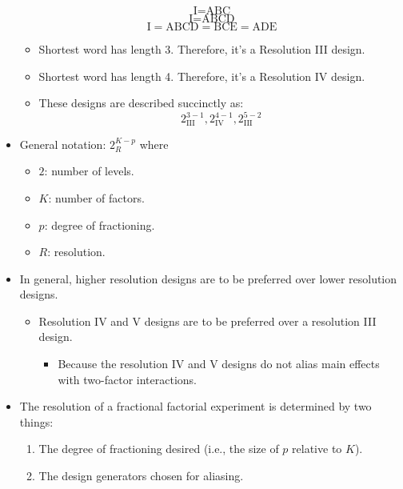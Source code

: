 \begin{itemize}[*]
          \[ \text{I}=\text{ABC} \]
          \[ \text{I}=\text{ABCD} \]
          \[ \text{I}=\text{ABCD}=\text{BCE}=\text{ADE} \]
          \begin{itemize}[label={}]
              \item Shortest word has length 3. Therefore, it's a Resolution III design.
              \item Shortest word has length 4. Therefore, it's a Resolution IV design.
              \item These designs are described succinctly as:
                    \[ 2^{3-1}_{\text{III}},2^{4-1}_{\text{IV}},2^{5-2}_{\text{III}} \]
          \end{itemize}
    \item General notation: $ 2_R^{K-p} $ where
          \begin{itemize}
              \item $ 2 $: number of levels.
              \item $ K $: number of factors.
              \item $ p $: degree of fractioning.
              \item $ R $: resolution.
          \end{itemize}
\end{itemize}
\begin{itemize}[*]
    \item In general, higher resolution designs are to be preferred over lower resolution designs.
          \begin{itemize}
              \item Resolution IV and V designs are to be preferred over a resolution III design.
                    \begin{itemize}[$\hookrightarrow$]
                        \item Because the resolution IV and V designs do not alias main effects with two-factor interactions.
                    \end{itemize}
          \end{itemize}
\end{itemize}
\begin{itemize}
    \item The resolution of a fractional factorial experiment is determined by two things:
          \begin{enumerate}[1.]
              \item The degree of fractioning desired (i.e., the size of $p$ relative to $K$).
              \item The design generators chosen for aliasing.
          \end{enumerate}
\end{itemize}
